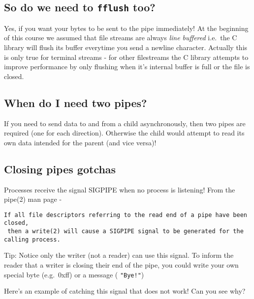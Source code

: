 \subsection{\texorpdfstring{So do we need to \texttt{fflush}
too?}{So do we need to fflush too?}}\label{so-do-we-need-to-fflush-too}

Yes, if you want your bytes to be sent to the pipe immediately! At the
beginning of this course we assumed that file streams are always
\emph{line buffered} i.e.~the C library will flush its buffer everytime
you send a newline character. Actually this is only true for terminal
streams - for other filestreams the C library attempts to improve
performance by only flushing when it's internal buffer is full or the
file is closed.

\subsection{When do I need two pipes?}\label{when-do-i-need-two-pipes}

If you need to send data to and from a child asynchronously, then two
pipes are required (one for each direction). Otherwise the child would
attempt to read its own data intended for the parent (and vice versa)!

\subsection{Closing pipes gotchas}\label{closing-pipes-gotchas}

Processes receive the signal SIGPIPE when no process is listening! From
the pipe(2) man page -

\begin{verbatim}
If all file descriptors referring to the read end of a pipe have been closed,
 then a write(2) will cause a SIGPIPE signal to be generated for the calling process. 
\end{verbatim}

Tip: Notice only the writer (not a reader) can use this signal. To
inform the reader that a writer is closing their end of the pipe, you
could write your own special byte (e.g.~0xff) or a message (
\texttt{"Bye!"})

Here's an example of catching this signal that does not work! Can you
see why?

